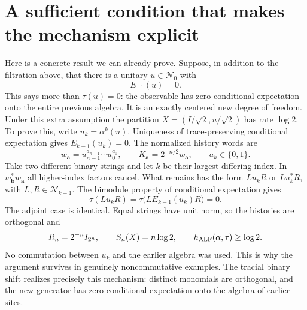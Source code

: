 \documentclass[11pt,a4paper]{article}
\begin{document}
\section{A sufficient condition that makes the mechanism explicit}
Here is a concrete result we can already prove. Suppose, in addition to the filtration above, that there is a unitary $u\in\mathcal N_0$ with
\[E_{-1}(u)=0.\]
This says more than $\tau(u)=0$: the observable has zero conditional expectation onto the entire previous algebra. It is an exactly centered new degree of freedom. Under this extra assumption the partition $X=(I/\sqrt2,u/\sqrt2)$ has rate $\log2$.
To prove this, write $u_k=\alpha^k(u)$. Uniqueness of trace-preserving conditional expectation gives $E_{k-1}(u_k)=0$. The normalized history words are
\[w_{\boldsymbol a}=u_{n-1}^{a_{n-1}}\cdots u_0^{a_0},\qquad K_{\boldsymbol a}=2^{-n/2}w_{\boldsymbol a},\qquad a_k\in\{0,1\}.\]
Take two different binary strings and let $k$ be their largest differing index. In $w_{\boldsymbol b}^*w_{\boldsymbol a}$ all higher-index factors cancel. What remains has the form $L u_k R$ or $L u_k^*R$, with $L,R\in\mathcal N_{k-1}$. The bimodule property of conditional expectation gives
\[\tau(Lu_kR)=\tau\bigl(LE_{k-1}(u_k)R\bigr)=0.\]
The adjoint case is identical. Equal strings have unit norm, so the histories are orthogonal and
\[R_n=2^{-n}I_{2^n},\qquad S_n(X)=n\log2,\qquad h_{\rm ALF}(\alpha,\tau)\geq\log2.\]
No commutation between $u_k$ and the earlier algebra was used. This is why the argument survives in genuinely noncommutative examples. The tracial binary shift realizes precisely this mechanism: distinct monomials are orthogonal, and the new generator has zero conditional expectation onto the algebra of earlier sites.
\end{document}
